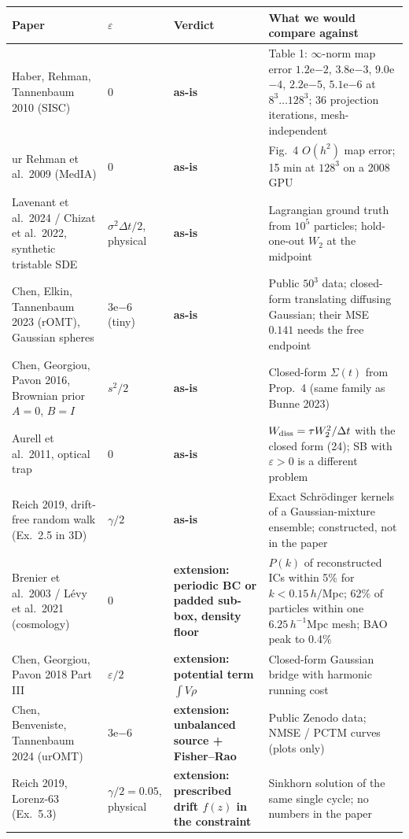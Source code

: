 \documentclass[11pt]{article}
\newcommand{\eps}{\varepsilon}
\newcommand{\asis}{\textcolor{OliveGreen}{\textbf{as-is}}}
\newcommand{\ext}[1]{\textcolor{BurntOrange}{\textbf{extension: #1}}}
\begin{document}
\begin{center}
\small
\begin{tabular}{@{}p{4.2cm}p{1.6cm}p{3.0cm}p{5.6cm}@{}}
\toprule
Paper & $\eps$ & Verdict & What we would compare against \\
\midrule
Haber, Rehman, Tannenbaum 2010 (SISC) & $0$ & \asis & Table 1: $\infty$-norm map error $1.2$e$-2$, $3.8$e$-3$, $9.0$e$-4$, $2.2$e$-5$, $5.1$e$-6$ at $8^3\ldots128^3$; 36 projection iterations, mesh-independent \\
ur Rehman et al.\ 2009 (MedIA) & $0$ & \asis & Fig.~4 $O(h^2)$ map error; 15 min at $128^3$ on a 2008 GPU \\
Lavenant et al.\ 2024 / Chizat et al.\ 2022, synthetic tristable SDE & $\sigma^2\Delta t/2$, physical & \asis & Lagrangian ground truth from $10^5$ particles; hold-one-out $W_2$ at the midpoint \\
Chen, Elkin, Tannenbaum 2023 (rOMT), Gaussian spheres & $3$e$-6$ (tiny) & \asis & Public $50^3$ data; closed-form translating diffusing Gaussian; their MSE $0.141$ needs the free endpoint \\
Chen, Georgiou, Pavon 2016, Brownian prior $A=0$, $B=I$ & $s^2/2$ & \asis & Closed-form $\Sigma(t)$ from Prop.~4 (same family as Bunne 2023) \\
Aurell et al.\ 2011, optical trap & $0$ & \asis & $W_{\rm diss}=\tau W_2^2/\Delta t$ with the closed form (24); SB with $\eps>0$ is a different problem \\
Reich 2019, drift-free random walk (Ex.~2.5 in 3D) & $\gamma/2$ & \asis & Exact Schr\"odinger kernels of a Gaussian-mixture ensemble; constructed, not in the paper \\
\midrule
Brenier et al.\ 2003 / L\'evy et al.\ 2021 (cosmology) & $0$ & \ext{periodic BC or padded sub-box, density floor} & $P(k)$ of reconstructed ICs within 5\% for $k<0.15\,h/$Mpc; 62\% of particles within one $6.25\,h^{-1}$Mpc mesh; BAO peak to 0.4\% \\
Chen, Georgiou, Pavon 2018 Part III & $\eps/2$ & \ext{potential term $\int V\rho$} & Closed-form Gaussian bridge with harmonic running cost \\
Chen, Benveniste, Tannenbaum 2024 (urOMT) & $3$e$-6$ & \ext{unbalanced source + Fisher--Rao} & Public Zenodo data; NMSE / PCTM curves (plots only) \\
Reich 2019, Lorenz-63 (Ex.~5.3) & $\gamma/2=0.05$, physical & \ext{prescribed drift $f(z)$ in the constraint} & Sinkhorn solution of the same single cycle; no numbers in the paper \\

\end{tabular}
\end{center}
\end{document}
